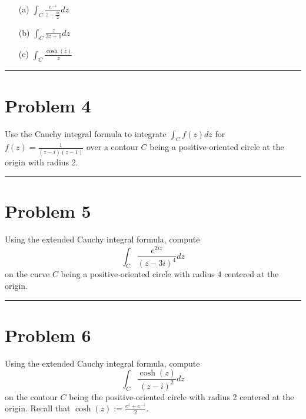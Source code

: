 \documentclass{article}
\let\oldcosh\cosh
\renewcommand{\cosh}[1]{\oldcosh\left(#1\right)}
\begin{document}
 \begin{enumerate}
 \item[(a)] $\int_C \frac{e^{-z}}{z-\frac{\pi i}{2}}dz$
 \item[(b)] $\int_C \frac{z}{2z+1}dz$
 \item[(c)] $\int_C \frac{\cosh{z}}{z}$
 \end{enumerate}
 
\vspace{.5cm} %

\hrule
\newpage
\section*{Problem 4}
Use the Cauchy integral formula to integrate $\int_C f(z)dz$ for $f(z) = \frac{1}{(z-i)(z-1)}$ over a contour $C$ being a positive-oriented circle at the origin with radius 2. 
	
\vspace{.5cm} %

\hrule
\newpage
\section*{Problem 5}
Using the extended Cauchy integral formula, compute \[ \int_C \frac{e^{2i z}}{(z-3i)^4} dz \] on the curve $C$ being a positive-oriented circle with radius 4 centered at the origin.
	

\vspace{.5cm} %

\hrule
\newpage
\section*{Problem 6}
Using the extended Cauchy integral formula, compute \[ \int_C \frac{\cosh{z}}{(z-i)^2} dz \] on the contour $C$ being the positive-oriented circle with radius 2 centered at the origin. Recall that $\cosh{z} := \frac{e^z + e^{-z}}{2}.$
	
\end{document}
